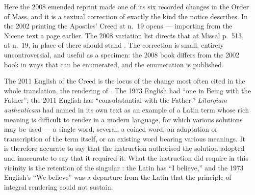 Here the 2008 emended reprint made one of its six recorded changes in the Order of Mass, and it
is a textual correction of exactly the kind the notice describes. In the 2002 printing the
Apostles' Creed at n.\ 19 opens  --- importing  from the Nicene text a page earlier. The 2008 variation
list directs that at Missal p.\ 513, at n.\ 19, in place of  there
should stand . The correction is small, entirely
uncontroversial, and useful as a specimen: the 2008 book differs from the 2002 book in ways
that can be enumerated, and the enumeration is published.

The 2011 English of the Creed is the locus of the change most often cited in the whole
translation, the rendering of . The 1973 English had ``one in
Being with the Father''; the 2011 English has ``consubstantial with the Father.''
\emph{Liturgiam authenticam} had named  in its own text as an example of
a Latin term whose rich meaning is difficult to render in a modern language, for which various
solutions may be used --- a single word, several, a coined word, an adaptation or transcription
of the term itself, or an existing word bearing various meanings. It is therefore accurate to say that the instruction authorised the
solution adopted and inaccurate to say that it required it. What the instruction did require in
this vicinity is the retention of the singular : the Latin has ``I believe,'' and
the 1973 English's ``We believe'' was a departure from the Latin that the principle of integral
rendering could not sustain.

